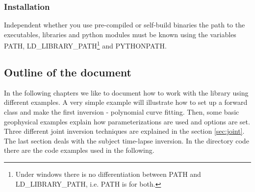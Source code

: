 \subsubsection*{Installation}
Independent whether you use pre-compiled or self-build binaries the path to the executables, libraries and python modules must be known using the variables PATH, LD\_LIBRARY\_PATH\footnote{Under windows there is no differentiation between PATH and LD\_LIBRARY\_PATH, i.e. PATH is for both.} and PYTHONPATH.

\subsection{Outline of the document}\label{sec:overview}
In the following chapters we like to document how to work with the library using different examples.
A very simple example will illustrate how to set up a forward class and make the first inversion - polynomial curve fitting.
Then, some basic geophysical examples explain how parameterizations are used and options are set.
Three different joint inversion techniques are explained in the section \ref{sec:joint}.
The last section deals with the subject time-lapse inversion.
In the directory code there are the code examples used in the following.
